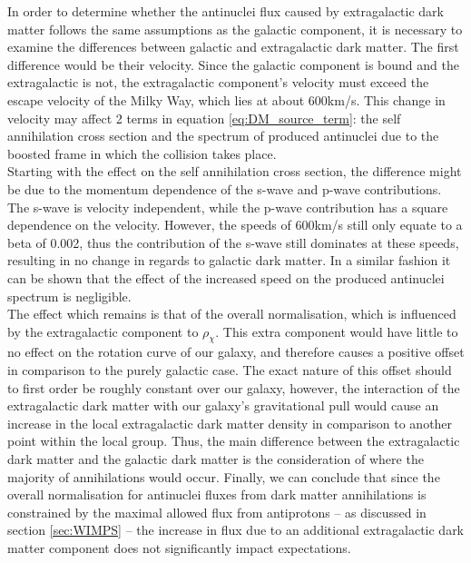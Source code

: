 In order to determine whether the antinuclei flux caused by extragalactic dark matter follows the same assumptions as the galactic component, it is necessary to examine the differences between galactic and extragalactic dark matter. The first difference would be their velocity. Since the galactic component is bound and the extragalactic is not, the extragalactic component's velocity must exceed the escape velocity of the Milky Way, which lies at about 600km/s. This change in velocity may affect 2 terms in equation \ref{eq:DM_source_term}: the self annihilation cross section and the spectrum of produced antinuclei due to the boosted frame in which the collision takes place. \\
Starting with the effect on the self annihilation cross section, the difference might be due to the momentum dependence of the s-wave and p-wave contributions. The s-wave is velocity independent, while the p-wave contribution has a square dependence on the velocity. However, the speeds of 600km/s still only equate to a beta of 0.002, thus the contribution of the s-wave still dominates at these speeds, resulting in no change in regards to galactic dark matter. In a similar fashion it can be shown that the effect of the increased speed on the produced antinuclei spectrum is negligible. \\

The effect which remains is that of the overall normalisation, which is influenced by the extragalactic component to $\rho_\chi$. This extra component would have little to no effect on the rotation curve of our galaxy, and therefore causes a positive offset in comparison to the purely galactic case. The exact nature of this offset should to first order be roughly constant over our galaxy, however, the interaction of the extragalactic dark matter with our galaxy's gravitational pull would cause an increase in the local extragalactic dark matter density in comparison to another point within the local group. Thus, the main difference between the extragalactic dark matter and the galactic dark matter is the consideration of where the majority of annihilations would occur. Finally, we can conclude that since the overall normalisation for antinuclei fluxes from dark matter annihilations is constrained by the maximal allowed flux from antiprotons -- as discussed in section \ref{sec:WIMPS} -- the increase in flux due to an additional extragalactic dark matter component does not significantly impact expectations. \\

